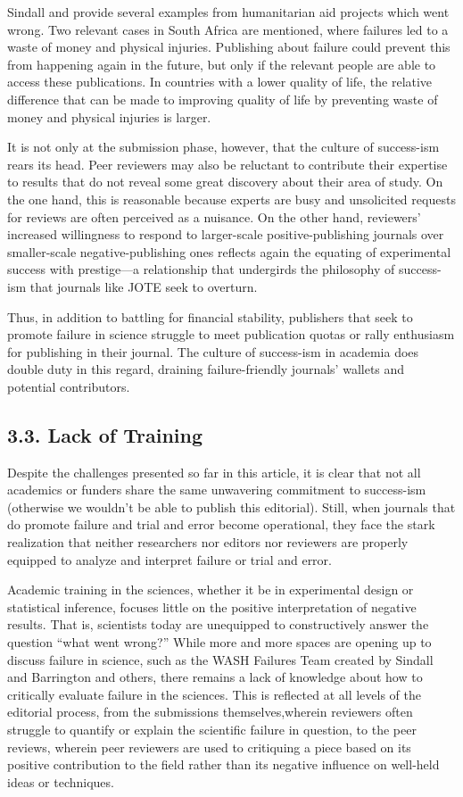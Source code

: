 \documentclass{article}
\begin{document}
Sindall and \parencite{Barrington2020} provide several examples from humanitarian aid projects which went wrong. Two relevant cases in South Africa are mentioned, where failures led to a waste of money and physical injuries. Publishing about failure could prevent this from happening again in the future, but only if the relevant people are able to access these publications. In countries with a lower quality of life, the relative difference that can be made to improving quality of life by preventing waste of money and physical injuries is larger. 

It is not only at the submission phase, however, that the culture of success-ism rears its head. Peer reviewers may also be reluctant to contribute their expertise to results that do not reveal some great discovery about their area of study. On the one hand, this is reasonable because experts are busy and unsolicited requests for reviews are often perceived as a nuisance. On the other hand, reviewers' increased willingness to respond to larger-scale positive-publishing journals over smaller-scale negative-publishing ones reflects again the equating of experimental success with prestige—a relationship that undergirds the philosophy of success-ism that journals like JOTE seek to overturn. 

Thus, in addition to battling for financial stability, publishers that seek to promote failure in science struggle to meet publication quotas or rally enthusiasm for publishing in their journal. The culture of success-ism in academia does double duty in this regard, draining failure-friendly journals' wallets and potential contributors.

\subsection{3\textbf{.3. }\textbf{Lack of Training }}

\textbf{}Despite the challenges presented so far in this article, it is clear that not all academics or funders share the same unwavering commitment to success-ism (otherwise we wouldn't be able to publish this editorial). Still, when journals that do promote failure and trial and error become operational, they face the stark realization that neither researchers nor editors nor reviewers are properly equipped to analyze and interpret failure or trial and error. 

Academic training in the sciences, whether it be in experimental design or statistical inference, focuses little on the positive interpretation of negative results. That is, scientists today are unequipped to constructively answer the question “what went wrong?” While more and more spaces are opening up to discuss failure in science, such as the WASH Failures Team created by Sindall and Barrington and others, there remains a lack of knowledge about how to critically evaluate failure in the sciences. This is reflected at all levels of the editorial process, from the submissions themselves,wherein reviewers often struggle to quantify or explain the scientific failure in question, to the peer reviews, wherein peer reviewers are used to critiquing a piece based on its positive contribution to the field rather than its negative influence on well-held ideas or techniques. 
\end{document}
